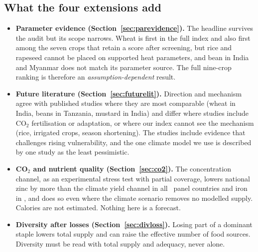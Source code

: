 \subsection{What the four extensions add}
\begin{itemize}
\item \textbf{Parameter evidence (Section~\ref{sec:parevidence}).} The headline survives the audit but its scope
narrows. Wheat is first in the full index and also first among the seven crops that retain a score after screening, but
rice and rapeseed cannot be placed on supported heat parameters, and bean in India and Myanmar does not match its
parameter source. The full nine-crop ranking is therefore an \emph{assumption-dependent} result.
\item \textbf{Future literature (Section~\ref{sec:futurelit}).} Direction and mechanism agree with published studies
where they are most comparable (wheat in India, beans in Tanzania, mustard in India) and differ where studies include
CO$_2$ fertilisation or adaptation, or where our index cannot see the mechanism (rice, irrigated crops, season
shortening). The studies include evidence that challenges rising vulnerability, and the one climate model we use is
described by one study as the least pessimistic.
\item \textbf{CO$_2$ and nutrient quality (Section~\ref{sec:co2}).} The concentration channel, as an experimental
stress test with partial coverage, lowers national zinc by more than the climate yield channel in all
\cotwoNCountries\ panel countries and iron in \cotwoNQualGtQtyIron, and does so even where the climate scenario removes no
modelled supply. Calories are not estimated. Nothing here is a forecast.
\item \textbf{Diversity after losses (Section~\ref{sec:divloss}).} Losing part of a dominant staple lowers total
supply and can raise the effective number of food sources. Diversity must be read with total supply and adequacy,
never alone.
\end{itemize}

